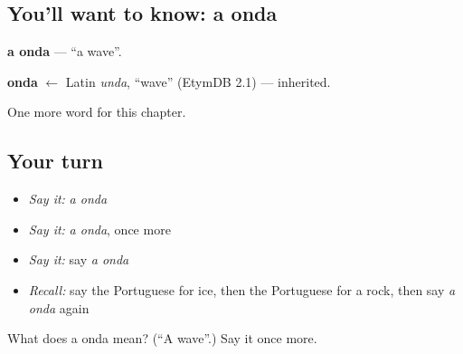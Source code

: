 \subsection*{You'll want to know: a onda}
\textbf{a onda} — \textquotedblleft{}a wave\textquotedblright{}.

\begin{cousinweb}
\textbf{onda} $\leftarrow$ Latin \emph{unda}, \textquotedblleft{}wave\textquotedblright{} (EtymDB 2.1) — inherited.
\end{cousinweb}

\begin{grammarlens}[title={What you've built}]
One more word for this chapter.
\end{grammarlens}

\subsection*{Your turn}
\begin{itemize}
\raggedright
  \item \emph{Say it:} \emph{a onda}
  \item \emph{Say it:} \emph{a onda}, once more
  \item \emph{Say it:} say \emph{a onda}
  \item \emph{Recall:} say the Portuguese for ice, then the Portuguese for a rock, then say \emph{a onda} again
\end{itemize}

\begin{tcolorbox}[breakable,colback=teal!4,colframe=teal!35!black,title={Before you move on}]
What does a onda mean? (\textquotedblleft{}A wave\textquotedblright{}.) Say it once more.
\end{tcolorbox}
